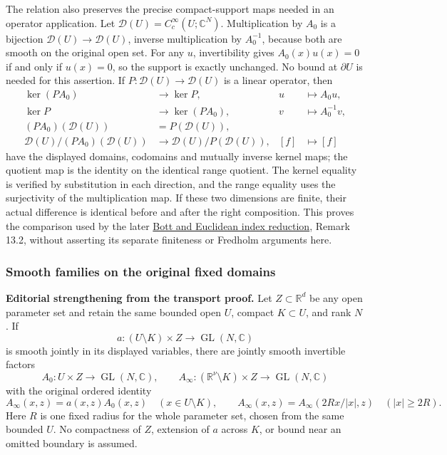 \documentclass[
  11pt,
]{article}
\begin{document}
The relation also preserves the precise compact-support maps needed in
an operator application. Let
\(\mathcal D(U)=C_c^\infty(U;\mathbb C^N)\). Multiplication by \(A_0\)
is a bijection \(\mathcal D(U)\to\mathcal D(U)\), inverse multiplication
by \(A_0^{-1}\), because both are smooth on the original open set. For
any \(u\), invertibility gives \(A_0(x)u(x)=0\) if and only if
\(u(x)=0\), so the support is exactly unchanged. No bound at
\(\partial U\) is needed for this assertion. If
\(P:\mathcal D(U)\to\mathcal D(U)\) is a linear operator, then \[
 \begin{aligned}
 \ker(PA_0)&\longrightarrow\ker P,& u&\longmapsto A_0u,\\
 \ker P&\longrightarrow\ker(PA_0),& v&\longmapsto A_0^{-1}v,\\
 (PA_0)(\mathcal D(U))&=P(\mathcal D(U)),&&\\
 \mathcal D(U)/(PA_0)(\mathcal D(U))
   &\longrightarrow\mathcal D(U)/P(\mathcal D(U)),&[f]&\longmapsto[f]
 \end{aligned}
 \tag{MG5}
\] have the displayed domains, codomains and mutually inverse kernel
maps; the quotient map is the identity on the identical range quotient.
The kernel equality is verified by substitution in each direction, and
the range equality uses the surjectivity of the multiplication map. If
these two dimensions are finite, their actual difference is identical
before and after the right composition. This proves the comparison used
by the later \href{bott-suspension.pdf}{Bott and Euclidean index
reduction}, Remark 13.2, without asserting its separate finiteness or
Fredholm arguments here.

\subsubsection{Smooth families on the original fixed
domains}\label{smooth-families-on-the-original-fixed-domains}

\textbf{Editorial strengthening from the transport proof.} Let
\(Z\subset\mathbb R^d\) be any open parameter set and retain the same
bounded open \(U\), compact \(K\subset U\), and rank \(N\). If \[
 a:(U\setminus K)\times Z\longrightarrow\operatorname{GL}(N,\mathbb C)
 \tag{M34}
\] is smooth jointly in its displayed variables, there are jointly
smooth invertible factors \[
 A_0:U\times Z\longrightarrow\operatorname{GL}(N,\mathbb C),\qquad
 A_\infty:(\mathbb R^\nu\setminus K)\times Z\longrightarrow\operatorname{GL}(N,\mathbb C)
 \tag{M35}
\] with the original ordered identity \[
 A_\infty(x,z)=a(x,z)A_0(x,z)\quad(x\in U\setminus K),\qquad
 A_\infty(x,z)=A_\infty(2Rx/|x|,z)\quad(|x|\geq2R).
 \tag{M36}
\] Here \(R\) is one fixed radius for the whole parameter set, chosen
from the same bounded \(U\). No compactness of \(Z\), extension of \(a\)
across \(K\), or bound near an omitted boundary is assumed.
\end{document}
